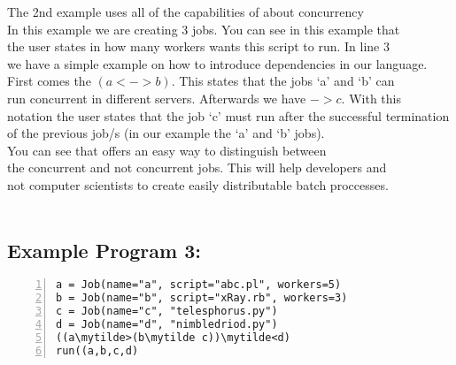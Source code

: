 The 2nd example uses all of the capabilities of \lang{} about concurrency\\
In this example we are creating 3 jobs. You can see in this example that\\
the user states in how many workers wants this script to run. In line 3\\
we have a simple example on how to introduce dependencies in our language.\\
First comes the $(a <-> b)$. This states that the jobs `a' and `b' can\\
run concurrent in different servers. Afterwards we have $-> c$. With this\\
notation the user states that the job `c' must run after the successful termination\\
of the previous job/s (in our example the `a' and `b' jobs).\\

You can see that \lang{} offers an easy way to distinguish between\\
the concurrent and not concurrent jobs. This will help developers and\\
not computer scientists to create easily distributable batch proccesses.\\
\\

\subsection*{Example Program 3:}
\begin{Verbatim}[numbers=left,commandchars=\\\{\}]
a = Job(name="a", script="abc.pl", workers=5)
b = Job(name="b", script="xRay.rb", workers=3)
c = Job(name="c", "telesphorus.py")
d = Job(name="d", "nimbledriod.py")
((a\mytilde>(b\mytilde c))\mytilde<d)
run((a,b,c,d)
\end{Verbatim}

